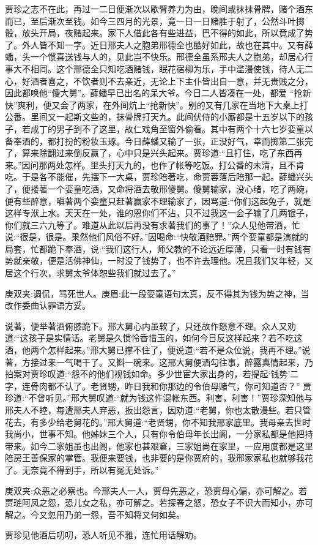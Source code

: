 \begin{parag}
    贾珍之志不在此，再过一二日便渐次以歇臂养力为由，晚间或抹抹骨牌，赌个酒东而已，至后渐次至钱。如今三四月的光景，竟一日一日赌胜于射了，公然斗叶掷骰，放头开局，夜赌起来。家下人借此各有些进益，巴不得的如此，所以竟成了势了。外人皆不知一字。近日邢夫人之胞弟邢德全也酷好如此，故也在其中。又有薛蟠，头一个惯喜送钱与人的，见此岂不快乐。邢德全虽系邢夫人之胞弟，却居心行事大不相同。这个邢德全只知吃酒赌钱，眠花宿柳为乐，手中滥漫使钱，待人无二心，好酒者喜之，不饮者则不去亲近，无论上下主仆皆出自一意，并无贵贱之分，因此都唤他“傻大舅”。薛蟠早已出名的呆大爷。今日二人皆凑在一处，都爱 “抢新快”爽利，便又会了两家，在外间炕上“抢新快”。别的又有几家在当地下大桌上打公番。里间又一起斯文些的，抹骨牌打天九。此间伏侍的小厮都是十五岁以下的孩子，若成丁的男子到不了这里，故仁戏角至窗外偷看。其中有两个十六七岁娈童以备奉酒的，都打扮的粉妆玉琢。今日薛蟠又输了一张，正没好气，幸而掷第二张完了，算来除翻过来倒反赢了，心中只是兴头起来。贾珍道:“且打住，吃了东西再来。”因问那两处怎样。里头打天九的，也作了帐等吃饭。打公番的未清，且不肯吃。于是各不能催，先摆下一大桌，贾珍陪著吃，命贾蓉落后陪那一起。薛蟠兴头了，便搂著一个娈童吃酒，又命将酒去敬邢傻舅。傻舅输家，没心绪，吃了两碗，便有些醉意，嗔著两个娈童只赶著赢家不理输家了，因骂道:“你们这起兔子，就是这样专洑上水。天天在一处，谁的恩你们不沾，只不过我这一会子输了几两银子，你们就三六九等了。难道从此以后再没有求著我们的事了！”众人见他带酒，忙说:“很是，很是。果然他们风俗不好。”因喝命:“快敬酒赔罪。”两个娈童都是演就的局套，忙都跪下奉酒，说:“我们这行人，师父教的不论远近厚薄，只看一时有钱有势就亲敬，便是活佛神仙，一时没了钱势了，也不许去理他。况且我们又年轻，又居这个行次，求舅太爷体恕些我们就过去了。”\begin{note}庚双夹:调侃，骂死世人。庚眉:此一段娈童语句太真，反不得其为钱为势之神，当改作委曲认罪语方妥。\end{note}说著，便举著酒俯膝跪下。邢大舅心内虽软了，只还故作怒意不理。众人又劝道:“这孩子是实情话。老舅是久惯怜香惜玉的，如何今日反这样起来？若不吃这酒，他两个怎样起来。”邢大舅已撑不住了，便说道:“若不是众位说，我再不理。”说著，方接过来一气喝干了。又斟一碗来。这邢大舅便酒勾往事，醉露真情起来，乃拍案对贾珍叹道:“怨不的他们视钱如命。多少世宦大家出身的，若提起‘钱势’二字，连骨肉都不认了。老贤甥，昨日我和你那边的令伯母赌气，你可知道否？” 贾珍道:“不曾听见。”邢大舅叹道:“就为钱这件混帐东西。利害，利害！”贾珍深知他与邢夫人不睦，每遭邢夫人弃恶，扳出怨言，因劝道:“老舅，你也太散漫些。若只管花去，有多少给老舅花的。”邢大舅道:“老贤甥，你不知我邢家底里。我母亲去世时我尚小，世事不知。他姊妹三个人，只有你令伯母年长出阁，一分家私都是他把持带来。如今二家姐虽也出阁，他家也甚艰窘，三家姐尚在家里，一应用度都是这里陪房王善保家的掌管。我便来要钱，也非要的是你贾府的，我邢家家私也就够我花了。无奈竟不得到手，所以有冤无处诉。”\begin{note}庚双夹:众恶之必察也。今邢夫人一人，贾母先恶之，恐贾母心偏，亦可解之。若贾琏阿凤之怨，恐儿女之私，亦可解之。若探春之怒，恐女子不识大而知小，亦可解之。今又忽用乃弟一怨，吾不知将又何如矣。\end{note}贾珍见他酒后叨叨，恐人听见不雅，连忙用话解劝。
\end{parag}


